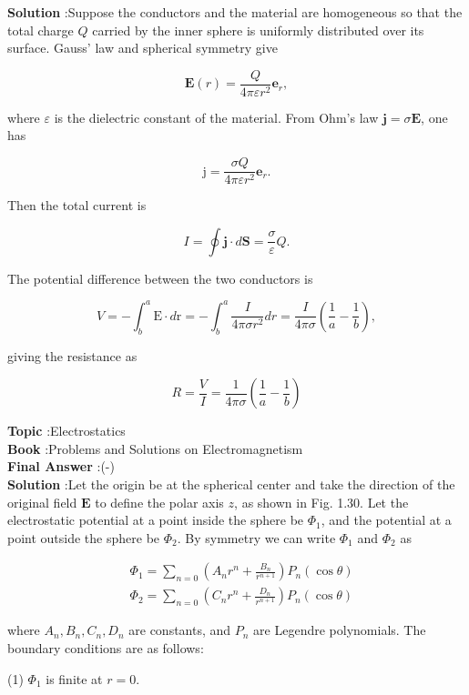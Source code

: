 \documentclass[10pt]{article}
\begin{document}
\textbf{Solution} :Suppose the conductors and the material are homogeneous so that the total charge $Q$ carried by the inner sphere is uniformly distributed over its surface. Gauss' law and spherical symmetry give

$$
\mathbf{E}(r)=\frac{Q}{4 \pi \varepsilon r^{2}} \mathbf{e}_{r},
$$

where $\varepsilon$ is the dielectric constant of the material. From Ohm's law $\mathbf{j}=\sigma \mathbf{E}$, one has

$$
\mathrm{j}=\frac{\sigma Q}{4 \pi \varepsilon r^{2}} \mathbf{e}_{r} .
$$

Then the total current is

$$
I=\oint \mathbf{j} \cdot d \mathbf{S}=\frac{\sigma}{\varepsilon} Q .
$$

The potential difference between the two conductors is

$$
V=-\int_{b}^{a} \mathrm{E} \cdot d \mathrm{r}=-\int_{b}^{a} \frac{I}{4 \pi \sigma r^{2}} d r=\frac{I}{4 \pi \sigma}\left(\frac{1}{a}-\frac{1}{b}\right),
$$

giving the resistance as

$$
R=\frac{V}{I}=\frac{1}{4 \pi \sigma}\left(\frac{1}{a}-\frac{1}{b}\right)
$$


\textbf{Topic} :Electrostatics\\
\textbf{Book} :Problems and Solutions on Electromagnetism\\
\textbf{Final Answer} :\left(-\right)\\


\textbf{Solution} :Let the origin be at the spherical center and take the direction of the original field $\mathbf{E}$ to define the polar axis $z$, as shown in Fig. 1.30. Let the electrostatic potential at a point inside the sphere be $\Phi_{1}$, and the potential at a point outside the sphere be $\Phi_{2}$. By symmetry we can write $\Phi_{1}$ and $\Phi_{2}$ as

$$
\begin{aligned}
&\Phi_{1}=\sum_{n=0}\left(A_{n} r^{n}+\frac{B_{n}}{r^{n+1}}\right) P_{n}(\cos \theta) \\
&\Phi_{2}=\sum_{n=0}\left(C_{n} r^{n}+\frac{D_{n}}{r^{n+1}}\right) P_{n}(\cos \theta)
\end{aligned}
$$

where $A_{n}, B_{n}, C_{n}, D_{n}$ are constants, and $P_{n}$ are Legendre polynomials. The boundary conditions are as follows:

(1) $\Phi_{1}$ is finite at $r=0$.
\end{document}
